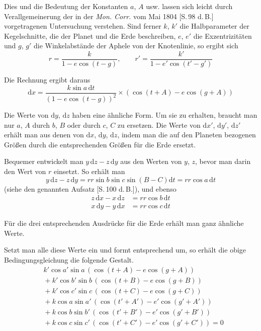 Dies und die Bedeutung der Konstanten $a$, $A$ usw. lassen sich leicht
durch Verallgemeinerung der in der \textit{Mon. Corr.} vom Mai 1804
[S.\,98 d.\,B.] vorgetragenen Untersuchung verstehen. Sind ferner $k$, $k'$
%
die Halbparameter der Kegelschnitte, die der Planet und die Erde
beschreiben, $e$, $e'$ die Exzentrizitäten und $g$, $g'$ die
Winkelabstände der Aphele von der Knotenlinie, so ergibt sich
\[
r=\frac{k}{1-e\cos(t-g)},\qquad r'=\frac{k'}{1-e'\cos(t'-g')}
\]

Die Rechnung ergibt daraus
\[
\mathrm{d}x=\frac{k\sin a\,\mathrm{d}t}{(1-e\cos(t-g))^2}\times(\cos(t+A)-e\cos(g+A))
\]

Die Werte von $\mathrm{d}y$, $\mathrm{d}z$ haben eine ähnliche Form.
Um sie zu erhalten, braucht man nur $a$, $A$ durch $b$, $B$ oder durch
$c$, $C$ zu ersetzen. Die Werte von $\mathrm{d}x'$, $\mathrm{d}y'$,
$\mathrm{d}z'$ erhält man aus denen von $\mathrm{d}x$, $\mathrm{d}y$,
$\mathrm{d}z$, indem man die auf den Planeten bezogenen Größen durch
die entsprechenden Größen für die Erde ersetzt.

Bequemer entwickelt man $y\,\mathrm{d}z-z\,\mathrm{d}y$ aus den
Werten von $y$, $z$, bevor man darin den Wert von $r$ einsetzt. So
erhält man
\[
y\,\mathrm{d}z-z\,\mathrm{d}y=rr\sin b\sin c\sin(B-C)\mathrm{d}t=rr\cos a\,\mathrm{d}t
\]
(siehe den genannten Aufsatz [S.\,100 d.\,B.]), und ebenso
\[
\begin{aligned}
z\,\mathrm{d}x-x\,\mathrm{d}z&=rr\cos b\,\mathrm{d}t\\
x\,\mathrm{d}y-y\,\mathrm{d}x&=rr\cos c\,\mathrm{d}t
\end{aligned}
\]

Für die drei entsprechenden Ausdrücke für die Erde erhält man
ganz ähnliche Werte.

Setzt man alle diese Werte ein und formt entsprechend um, so
erhält die obige Bedingungsgleichung die folgende Gestalt.
\[
\begin{aligned}
&k'\cos a'\sin a\,(\cos(t+A)-e\cos(g+A))\\
&{}+k'\cos b'\sin b\,(\cos(t+B)-e\cos(g+B))\\
&{}+k'\cos c'\sin c\,(\cos(t+C)-e\cos(g+C))\\
&{}+k\cos a\sin a'\,(\cos(t'+A')-e'\cos(g'+A'))\\
&{}+k\cos b\sin b'\,(\cos(t'+B')-e'\cos(g'+B'))\\
&{}+k\cos c\sin c'\,(\cos(t'+C')-e'\cos(g'+C'))=0
\end{aligned}
\]

